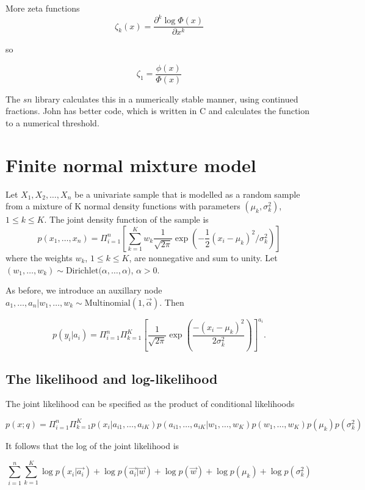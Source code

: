 \documentclass{amsart}
\begin{document}
More zeta functions
\[
\zeta_k(x) = \frac{\partial^k \log{\Phi(x)}}{\partial x^k}
\]

so

\[
\zeta_1 = \frac{\phi(x)}{\Phi(x)}
\]

The $sn$ library calculates this in a numerically stable manner, using continued fractions.
John has better code, which is written in C and calculates the function to a numerical
threshold.

\section{Finite normal mixture model}
Let $X_1, X_2, \ldots, X_n$ be a univariate sample that is modelled as a random sample from a
mixture of K normal density functions with parameters $(\mu_k, \sigma_k^2)$,
$1 \leq k \leq K$. The joint density function of the sample is
\begin{equation}\label{eq:gaussian_mixture}
p(x_1, \ldots, x_n) = \Pi_{i=1}^n \left [ \sum_{k=1}^K w_k \frac{1}{\sqrt{2 \pi}} \exp{ \left( -\frac{1}{2}(x_i - \mu_k)^2/\sigma_k^2 \right)} \right ]
\end{equation}
where the weights $w_k$, $1 \leq k \leq K$, are nonnegative and sum to unity. Let 
$(w_1, \ldots, w_k) \sim \text{Dirichlet($\alpha, \ldots, \alpha$)}$, $\alpha > 0$.


As before, we introduce an auxillary node
$a_1, \ldots, a_n|w_1, \ldots, w_k \sim \text{Multinomial}(1, \vec{\alpha})$. Then

\[
p(y_i|a_i) = \Pi_{i=1}^n \Pi_{k=1}^K \left [ \frac{1}{\sqrt{2 \pi}} \exp{ \left ( \frac{-(x_i - \mu_k)^2}{2 \sigma_k^2} \right )} \right ] ^{a_i}.
\]

\subsection{The likelihood and log-likelihood}
The joint likelihood can be specified as the product of conditional likelihoods

\[
p(x;q) = \Pi_{i=1}^n \Pi_{k=1}^K p(x_i|a_{i1}, \ldots, a_{iK}) p(a_{i1}, \ldots, a_{iK} | w_1, \ldots, w_K) p(w_1, \ldots, w_K) p(\mu_k) p(\sigma_k^2)
\]

It follows that the log of the joint likelihood is

\[
\sum_{i=1}^n \sum_{k=1}^K \log{p(x_i|\vec{a_i})} + \log{p(\vec{a_i}|\vec{w})} + \log{p(\vec{w})} + \log{p(\mu_k)} + \log{p(\sigma_k^2)}
\]
\end{document}
